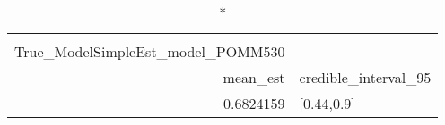 \begin{longtable}{rl}
\caption*{
{\large Ssummarytable} \\ 
{\small True\_ModelSimpleEst\_model\_POMM530}
} \\ 
\toprule
mean\_est & credible\_interval\_95 \\ 
\midrule
0.6824159 & [0.44,0.9] \\ 
\bottomrule
\end{longtable}

